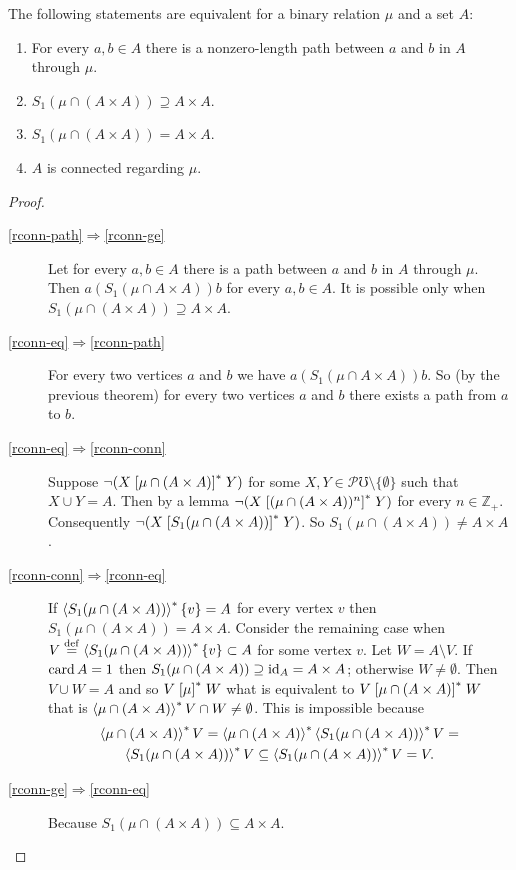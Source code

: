 \begin{thm}
The following statements are equivalent for a binary relation $\mu$
and a set $A$:
\begin{enumerate}
\item \label{rconn-path}For every $a,b\in A$ there is
a nonzero-length path between $a$ and $b$ in $A$ through $\mu$.
\item \label{rconn-ge}$S_1(\mu\cap(A\times A))\supseteq A\times A$.
\item \label{rconn-eq}$S_1(\mu\cap(A\times A))=A\times A$.
\item \label{rconn-conn}$A$ is connected regarding $\mu$.
\end{enumerate}
\end{thm}
\begin{proof}
~
\begin{description}
\item [{\ref{rconn-path}$\Rightarrow$\ref{rconn-ge}}] Let for every
$a,b\in A$ there is a path between $a$ and $b$ in $A$ through
$\mu$. Then $a\mathrel{(S_1(\mu\cap A\times A))}b$ for every $a,b\in A$.
It is possible only when $S_1(\mu\cap(A\times A))\supseteq A\times A$.
\item [{\ref{rconn-eq}$\Rightarrow$\ref{rconn-path}}] For every two
vertices $a$ and $b$ we have $a\mathrel{(S_1(\mu\cap A\times A))}b$.
So (by the previous theorem) for every two vertices $a$ and $b$
there exists a path from $a$ to $b$.
\item [{\ref{rconn-eq}$\Rightarrow$\ref{rconn-conn}}] Suppose $\lnot(X\mathrel{\left[\mu\cap(A\times A)\right]^{\ast}}Y)$
for some $X,Y\in\mathscr{P}\mho\setminus\{\emptyset\}$ such that
$X\cup Y=A$. Then by a lemma $\lnot(X\mathrel{\left[(\mu\cap(A\times A))^{n}\right]^{\ast}}Y)$
for every $n\in\mathbb{Z}_+$. Consequently $\lnot(X\mathrel{\left[S_1(\mu\cap(A\times A))\right]^{\ast}}Y)$.
So $S_1(\mu\cap(A\times A))\ne A\times A$.
\item [{\ref{rconn-conn}$\Rightarrow$\ref{rconn-eq}}] If $\left\langle S_1(\mu\cap(A\times A))\right\rangle ^{\ast}\{v\}=A$
for every vertex $v$ then $S_1(\mu\cap(A\times A))=A\times A$. Consider
the remaining case when $V\overset{\mathrm{def}}{=}\left\langle S_1(\mu\cap(A\times A))\right\rangle ^{\ast}\{v\}\subset A$
for some vertex $v$. Let $W=A\setminus V$. If $\operatorname{card} A=1$ then
$S_1(\mu\cap(A\times A))\supseteq\operatorname{id}_{A}=A\times A$; otherwise $W\neq\emptyset$.
Then $V\cup W=A$ and so $V\mathrel{\left[\mu\right]^{\ast}}W$ what is equivalent to
$V\mathrel{\left[\mu\cap(A\times A)\right]^{\ast}}W$ that is $\left\langle \mu\cap(A\times A)\right\rangle ^{\ast}V\cap W\ne\emptyset$.
This is impossible because
\begin{multline*}
\left\langle \mu\cap(A\times A)\right\rangle ^{\ast}V=\left\langle \mu\cap(A\times A)\right\rangle ^{\ast}\left\langle S_1(\mu\cap(A\times A))\right\rangle ^{\ast}V=\\
\left\langle S_{1}(\mu\cap(A\times A))\right\rangle ^{\ast}V\subseteq\left\langle S_1(\mu\cap(A\times A))\right\rangle ^{\ast}V=V.
\end{multline*}

\item [{\ref{rconn-ge}$\Rightarrow$\ref{rconn-eq}}] Because $S_1(\mu\cap(A\times A))\subseteq A\times A$.
\end{description}
\end{proof}
